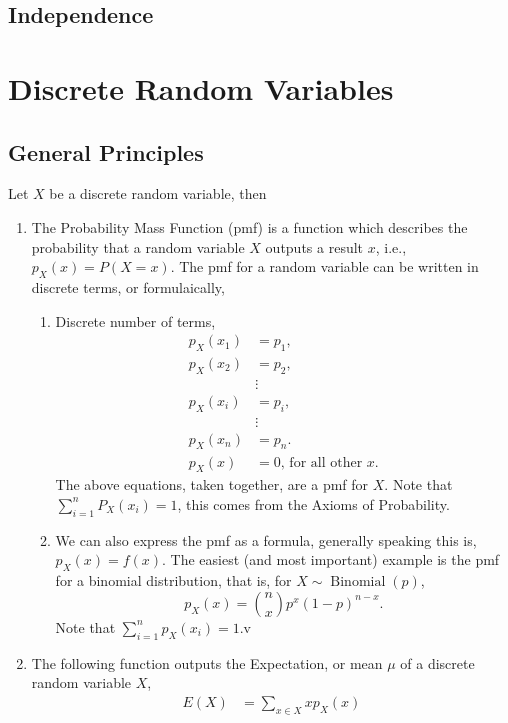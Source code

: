 \documentclass{amsproc}
\DeclareMathOperator{\bin}{\text{Binomial}}
\begin{document}
		\subsection{Independence}
	
	\section{Discrete Random Variables}
		\subsection{General Principles}
			Let $X$ be a discrete random variable, then
			\begin{enumerate}
				\item The Probability Mass Function (pmf) is a function which describes the probability that a random variable $X$ outputs a result $x$, i.e., $p_{X}(x) = P(X = x)$. The pmf for a random variable can be written in discrete terms, or formulaically,
					\begin{enumerate}
						\item Discrete number of terms,
							\begin{align*}
								p_{X}(x_{1}) &= p_{1}, \\
								p_{X}(x_{2}) &= p_{2}, \\
								&\vdots \\
								p_{X}(x_{i}) &= p_{i}, \\
								&\vdots \\
								p_{X}(x_{n}) &= p_{n}. \\
								p_{X}(x) &= 0\text{, for all other $x$.}
							\end{align*}
						The above equations, taken together, are a pmf for $X$. Note that $\sum_{i=1}^{n} P_{X}(x_{i}) = 1$, this comes from the Axioms of Probability.
						
						\item We can also express the pmf as a formula, generally speaking this is, $p_{X}(x) = f(x)$. The easiest (and most important) example is the pmf for a binomial distribution, that is, for $X \sim \bin(p)$, $$p_{X}(x) = \binom{n}{x}p^{x}(1-p)^{n-x}.$$ Note that $\sum_{i=1}^{n} p_{X}(x_{i}) = 1$.v
					\end{enumerate}

				\item The following function outputs the Expectation, or mean $\mu$ of a discrete random variable $X$,
					\begin{align*}
						E(X) &= \sum\limits_{x \in X} x p_{X}(x)
					\end{align*}


\end{enumerate}
\end{document}
